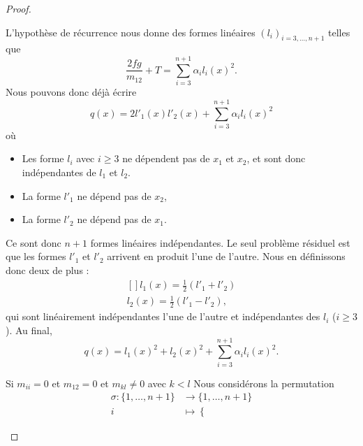 \begin{proof}
\begin{subproof}
            L'hypothèse de récurrence nous donne des formes linéaires \( (l_i)_{i=3,\ldots, n+1}\) telles que
            \begin{equation}
                \frac{ 2fg }{ m_{12} }+T=\sum_{i=3}^{n+1}\alpha_il_i(x)^2.
            \end{equation}
            Nous pouvons donc déjà écrire
            \begin{equation}
                q(x)=2l'_1(x)l'_2(x)+\sum_{i=3}^{n+1}\alpha_il_i(x)^2
            \end{equation}
            où
            \begin{itemize}
                \item Les forme \( l_i\) avec \( i\geq 3\) ne dépendent pas de \( x_1\) et \( x_2\), et sont donc indépendantes de \( l_1\) et \( l_2\).
                \item La forme \( l'_1\) ne dépend pas de \( x_2\),
                \item La forme \( l'_2\) ne dépend pas de \( x_1\).
            \end{itemize}
            Ce sont donc \( n+1\) formes linéaires indépendantes. Le seul problème résiduel est que les formes \( l'_1\) et \( l'_2\) arrivent en produit l'une de l'autre. Nous en définissons donc deux de plus :
            \begin{equation}
                \begin{aligned}[]
                    l_1(x)=\frac{ 1 }{2}(l'_1+l'_2)\\
                    l_2(x)=\frac{ 1 }{2}(l'_1-l'_2),
                \end{aligned}
            \end{equation}
            qui sont linéairement indépendantes l'une de l'autre et indépendantes des \( l_i\) (\( i\geq 3\)). Au final,
            \begin{equation}
                q(x)=l_1(x)^2+l_2(x)^2+\sum_{i=3}^{n+1}\alpha_il_i(x)^2.
            \end{equation}
        \item[Si \( m_{ii}=0\) et \( m_{12}=0\) et \( m_{kl}\neq 0\) avec \( k<l\)]
            Nous considérons la permutation
            \begin{equation}
                \begin{aligned}
                    \sigma\colon \{ 1,\ldots, n+1 \}&\to \{ 1,\ldots, n+1 \} \\
                    i&\mapsto \begin{cases}

\end{cases}
\end{aligned}
\end{equation}
\end{subproof}
\end{proof}
